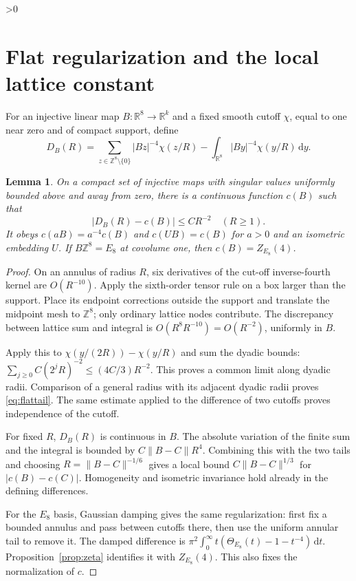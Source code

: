 \documentclass[11pt,a4paper]{article}
\newtheorem{lemma}[theorem]{Lemma}
\theoremstyle{definition}
\newcommand{\R}{\mathbb R}
\newcommand{\Z}{\mathbb Z}
\newcommand{\dd}{\,\mathrm d}
\newcommand{\norm}[1]{\lVert#1\rVert}
\newcommand{\abs}[1]{\lvert#1\rvert}
\numberwithin{equation}{section}
\let\originalsection\section
\renewcommand{\section}{\ifnum\value{section}>0\clearpage\fi\originalsection}
\begin{document}
\section{Flat regularization and the local lattice constant}\label{sec:flat}
For an injective linear map $B:\R^8\to\R^k$ and a fixed smooth cutoff $\chi$, equal to one near zero and of compact support, define
\begin{equation}
 D_B(R)=\sum_{z\in\Z^8\setminus\{0\}}\abs{Bz}^{-4}\chi(z/R)
             -\int_{\R^8}\abs{By}^{-4}\chi(y/R)\dd y.
\end{equation}

\begin{lemma}\label{lem:flat}
On a compact set of injective maps with singular values uniformly bounded above and away from zero, there is a continuous function $c(B)$ such that
\begin{equation}\label{eq:flattail}
 \abs{D_B(R)-c(B)}\le CR^{-2}\quad(R\ge1).
\end{equation}
It obeys $c(aB)=a^{-4}c(B)$ and $c(UB)=c(B)$ for $a>0$ and an isometric embedding $U$. If $B\Z^8=E_8$ at covolume one, then $c(B)=Z_{E_8}(4)$.
\end{lemma}
\begin{proof}
On an annulus of radius $R$, six derivatives of the cut-off inverse-fourth kernel are $O(R^{-10})$. Apply the sixth-order tensor rule on a box larger than the support. Place its endpoint corrections outside the support and translate the midpoint mesh to $\Z^8$; only ordinary lattice nodes contribute. The discrepancy between lattice sum and integral is $O(R^8R^{-10})=O(R^{-2})$, uniformly in $B$.

Apply this to $\chi(y/(2R))-\chi(y/R)$ and sum the dyadic bounds:
$\sum_{j\ge0}C(2^jR)^{-2}\le(4C/3)R^{-2}$. This proves a common limit along dyadic radii. Comparison of a general radius with its adjacent dyadic radii proves \eqref{eq:flattail}. The same estimate applied to the difference of two cutoffs proves independence of the cutoff.

For fixed $R$, $D_B(R)$ is continuous in $B$. The absolute variation of the finite sum and the integral is bounded by $C\norm{B-C}R^4$. Combining this with the two tails and choosing $R=\norm{B-C}^{-1/6}$ gives a local bound $C\norm{B-C}^{1/3}$ for $\abs{c(B)-c(C)}$. Homogeneity and isometric invariance hold already in the defining differences.

For the $E_8$ basis, Gaussian damping gives the same regularization: first fix a bounded annulus and pass between cutoffs there, then use the uniform annular tail to remove it. The damped difference is
$\pi^2\int_0^\infty t(\Theta_{E_8}(t)-1-t^{-4})\dd t$.
Proposition~\ref{prop:zeta} identifies it with $Z_{E_8}(4)$. This also fixes the normalization of $c$.
\end{proof}
\end{document}
